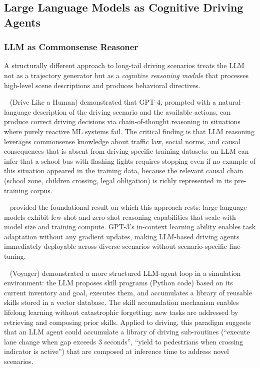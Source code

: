 \documentclass[12pt, a4paper]{article}
\begin{document}
\subsection{Large Language Models as Cognitive Driving Agents}

\subsubsection{LLM as Commonsense Reasoner}

A structurally different approach to long-tail driving scenarios treats the
LLM not as a trajectory generator but as a \emph{cognitive reasoning module}
that processes high-level scene descriptions and produces behavioral directives.

\citeauthor{fu2023drive}~\cite{fu2023drive} (Drive Like a Human) demonstrated
that GPT-4, prompted with a natural-language description of the driving scenario
and the available actions, can produce correct driving decisions via
chain-of-thought reasoning in situations where purely reactive ML systems fail.
The critical finding is that LLM reasoning leverages commonsense knowledge
about traffic law, social norms, and causal consequences that is absent from
driving-specific training datasets: an LLM can infer that a school bus with
flashing lights requires stopping even if no example of this situation appeared
in the training data, because the relevant causal chain (school zone, children
crossing, legal obligation) is richly represented in its pre-training corpus.

\citeauthor{brown2020language}~\cite{brown2020language} provided the foundational
result on which this approach rests: large language models exhibit few-shot and
zero-shot reasoning capabilities that scale with model size and training
compute.  GPT-3's in-context learning ability enables task adaptation without
any gradient updates, making LLM-based driving agents immediately deployable
across diverse scenarios without scenario-specific fine-tuning.

\citeauthor{wang2023voyager}~\cite{wang2023voyager} (Voyager) demonstrated a
more structured LLM-agent loop in a simulation environment: the LLM
proposes skill programs (Python code) based on its current inventory and goal,
executes them, and accumulates a library of reusable skills stored in a vector
database.  The skill accumulation mechanism enables lifelong learning without
catastrophic forgetting: new tasks are addressed by retrieving and composing
prior skills.  Applied to driving, this paradigm suggests that an LLM agent
could accumulate a library of driving sub-routines (``execute lane change when
gap exceeds 3 seconds'', ``yield to pedestrians when crossing indicator is
active'') that are composed at inference time to address novel scenarios.
\end{document}
